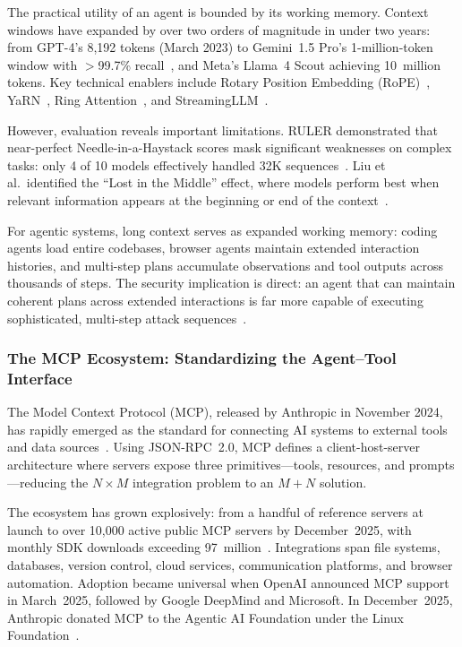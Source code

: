 The practical utility of an agent is bounded by its working memory. Context windows have expanded by over two orders of magnitude in under two years: from GPT-4's 8,192 tokens (March 2023) to Gemini~1.5 Pro's 1-million-token window with $>$99.7\% recall~\cite{gemini15}, and Meta's Llama~4 Scout achieving 10~million tokens. Key technical enablers include Rotary Position Embedding (RoPE)~\cite{su2024roformer}, YaRN~\cite{peng2024yarn}, Ring Attention~\cite{liu2024ringattention}, and StreamingLLM~\cite{xiao2024streamingllm}.

However, evaluation reveals important limitations. RULER demonstrated that near-perfect Needle-in-a-Haystack scores mask significant weaknesses on complex tasks: only 4 of 10 models effectively handled 32K sequences~\cite{hsieh2024ruler}. Liu et al.\ identified the ``Lost in the Middle'' effect, where models perform best when relevant information appears at the beginning or end of the context~\cite{liu2024lostmiddle}.

For agentic systems, long context serves as expanded working memory: coding agents load entire codebases, browser agents maintain extended interaction histories, and multi-step plans accumulate observations and tool outputs across thousands of steps. The security implication is direct: an agent that can maintain coherent plans across extended interactions is far more capable of executing sophisticated, multi-step attack sequences~\cite{anthropic2024effective}.


\subsubsection{The MCP Ecosystem: Standardizing the Agent--Tool Interface}
\label{sec:cap-mcp}

The Model Context Protocol (MCP), released by Anthropic in November 2024, has rapidly emerged as the standard for connecting AI systems to external tools and data sources~\cite{anthropic2024mcp}. Using JSON-RPC~2.0, MCP defines a client-host-server architecture where servers expose three primitives---tools, resources, and prompts---reducing the $N \times M$ integration problem to an $M+N$ solution.

The ecosystem has grown explosively: from a handful of reference servers at launch to over 10,000 active public MCP servers by December~2025, with monthly SDK downloads exceeding 97~million~\cite{mcp2025anniversary}. Integrations span file systems, databases, version control, cloud services, communication platforms, and browser automation. Adoption became universal when OpenAI announced MCP support in March~2025, followed by Google DeepMind and Microsoft. In December~2025, Anthropic donated MCP to the Agentic AI Foundation under the Linux Foundation~\cite{anthropic2025aaif}.

